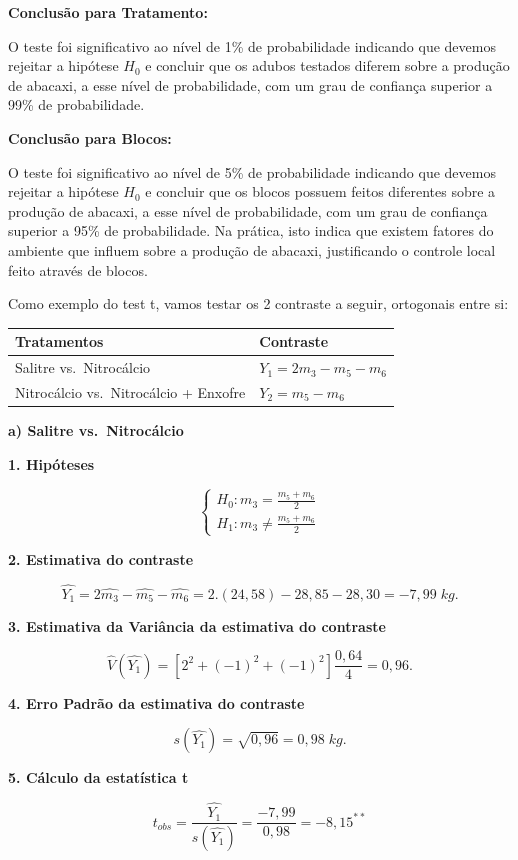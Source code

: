 \documentclass[
]{book}
\begin{document}
\textbf{Conclusão para Tratamento:}

O teste foi significativo ao nível de 1\% de probabilidade indicando que devemos rejeitar a hipótese \(H_{0}\) e concluir que os adubos testados diferem sobre a produção de abacaxi, a esse nível de probabilidade, com um grau de confiança superior a 99\% de probabilidade.

\textbf{Conclusão para Blocos:}

O teste foi significativo ao nível de 5\% de probabilidade indicando que devemos rejeitar a hipótese \(H_{0}\) e concluir que os blocos possuem feitos diferentes sobre a produção de abacaxi, a esse nível de probabilidade, com um grau de confiança superior a 95\% de probabilidade. Na prática, isto indica que existem fatores do ambiente que influem sobre a produção de abacaxi, justificando o controle local feito através de blocos.

Como exemplo do test t, vamos testar os 2 contraste a seguir, ortogonais entre si:

\begin{longtable}[]{@{}ll@{}}
\toprule
Tratamentos & Contraste\tabularnewline
\midrule
\endhead
Salitre vs.~Nitrocálcio & \(Y_1 = 2m_3 - m_5 -m_6\)\tabularnewline
Nitrocálcio vs.~Nitrocálcio + Enxofre & \(Y_2=m_5 - m_6\)\tabularnewline
\bottomrule
\end{longtable}

\textbf{a) Salitre vs.~Nitrocálcio}

\textbf{1. Hipóteses}

\[ 
\begin{cases}
H_0: m_3=\frac{m_5 + m_6}{2} \\
H_1: m_3 \neq  \frac{m_5 + m_6}{2}
\end{cases}
\]

\textbf{2. Estimativa do contraste}

\[
\hat{Y_1} = 2\hat{m_3} - \hat{m_5} - \hat{m_6} = 2.(24,58) - 28,85 - 28,30 = -7,99\;kg.
\]

\textbf{3. Estimativa da Variância da estimativa do contraste}

\[
\hat{V}(\hat{Y_1}) = [2^2+(-1)^2+(-1)^2]\frac{0,64}{4} = 0,96.
\]

\textbf{4. Erro Padrão da estimativa do contraste}

\[
s(\hat{Y_1}) = \sqrt{0,96} = 0,98\;kg.
\]

\textbf{5. Cálculo da estatística t }

\[
t_{obs} = \frac{\hat{Y_1}}{s(\hat{Y_1})} = \frac{-7,99}{0,98} = -8,15^{**}
\]
\end{document}

